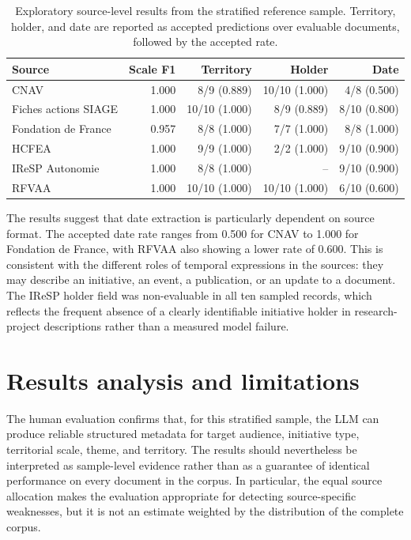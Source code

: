 \begin{table}[H]
\centering
\small
\begin{tabular}{lrrrr}
\toprule
Source & Scale F1 & Territory & Holder & Date \\
\midrule
CNAV & 1.000 & 8/9 (0.889) & 10/10 (1.000) & 4/8 (0.500) \\
Fiches actions SIAGE & 1.000 & 10/10 (1.000) & 8/9 (0.889) & 8/10 (0.800) \\
Fondation de France & 0.957 & 8/8 (1.000) & 7/7 (1.000) & 8/8 (1.000) \\
HCFEA & 1.000 & 9/9 (1.000) & 2/2 (1.000) & 9/10 (0.900) \\
IReSP Autonomie & 1.000 & 8/8 (1.000) & -- & 9/10 (0.900) \\
RFVAA & 1.000 & 10/10 (1.000) & 10/10 (1.000) & 6/10 (0.600) \\
\bottomrule
\end{tabular}
\caption{Exploratory source-level results from the stratified reference sample.
Territory, holder, and date are reported as accepted predictions over evaluable
documents, followed by the accepted rate.}
\label{tab:llm-source-results}
\end{table}

The results suggest that date extraction is particularly dependent on source
format. The accepted date rate ranges from 0.500 for CNAV to 1.000 for
Fondation de France, with RFVAA also showing a lower rate of 0.600. This is
consistent with the different roles of temporal expressions in the sources:
they may describe an initiative, an event, a publication, or an update to a
document. The IReSP holder field was non-evaluable in all ten sampled records,
which reflects the frequent absence of a clearly identifiable initiative holder
in research-project descriptions rather than a measured model failure.

\section{Results analysis and limitations}

The human evaluation confirms that, for this stratified sample, the LLM can
produce reliable structured metadata for target audience, initiative type,
territorial scale, theme, and territory. The results should nevertheless be
interpreted as sample-level evidence rather than as a guarantee of identical
performance on every document in the corpus. In particular, the equal source
allocation makes the evaluation appropriate for detecting source-specific
weaknesses, but it is not an estimate weighted by the distribution of the
complete corpus.

